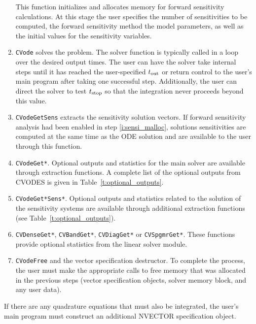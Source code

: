 \begin{enumerate}
  This function initializes and allocates memory for forward sensitivity calculations.
  At this stage the user specifies the number of sensitivities to be computed, 
  the forward sensitivity method 
  the model parameters, as well as the initial values for the sensitivity variables.
\item \label{i:solve}
  {\tt CVode} 
  solves the problem. 
  The solver function is typically called in a loop over the desired output times.
  The user can have the solver take internal steps until it has reached the
  user-specified $t_{\mbox{\scriptsize out}}$ or return control to the user's
  main program after taking one successful step. Additionally, the user can
  direct the solver to test $t_{\mbox{\scriptsize stop}}$ so that the
  integration never proceeds beyond this value.
\item \label{i:getsensi}
  {\tt CVodeGetSens}
  extracts the sensitivity solution vectors. If forward sensitivity analysis
  had been enabled in step \ref{i:sensi_malloc}, solutions sensitivities are
  computed at the same time as the ODE solution and are available to the user
  through this function.
\item \label{i:get}
  {\tt CVodeGet*}.
  Optional outputs and statistics for the main solver are available through 
  extraction functions. A complete list of the optional outputs from CVODES 
  is given in Table~\ref{t:optional_outputs}.
\item \label{i:sensi_get}
  {\tt CVodeGet*Sens*}.
  Optional outputs and statistics related to the solution of the sensitivity 
  systems are available through additional extraction functions 
  (see Table~\ref{t:optional_outputs}).
\item \label{i:ls_get}  
  {\tt CVDenseGet*}, {\tt CVBandGet*}, {\tt CVDiagGet*} or {\tt CVSpgmrGet*}.
  These functions provide optional statistics from the linear solver module.
\item \label{i:free}
  {\tt CVodeFree} and the vector specification destructor.
  To complete the process, the user must make the appropriate calls to
  free memory that was allocated in the previous steps 
  (vector specification objects, solver memory block, and any user data).
\end{enumerate}
%
%
If there are any quadrature equations that must also be integrated, the user's 
main program must construct an additional NVECTOR specification object. 
